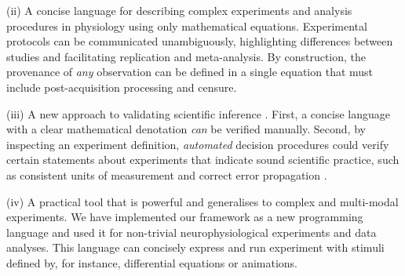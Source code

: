 (ii) A concise language for describing complex experiments and
analysis procedures in physiology using only mathematical
equations. Experimental protocols can be communicated unambiguously,
highlighting differences between studies and facilitating replication
and meta-analysis.  By construction, the provenance
\cite{Pool2002,MacKenzie-Graham2008, VanHorn2009} of \emph{any}
observation can be defined in a single equation that must include
post-acquisition processing and censure.

(iii) A new approach to validating scientific inference
\cite{Editors2003, Editors2010}. First, a concise language with a
clear mathematical denotation \emph{can} be verified manually. Second, by
inspecting an experiment definition, \emph{automated} decision procedures
could verify certain statements about experiments that indicate sound
scientific practice, such as consistent units of measurement
\cite{Kennedy1997} and correct error propagation \cite{Taylor1997}.

(iv) A practical tool that is powerful and generalises to complex and
multi-modal experiments. We have implemented our framework as a new
programming language and used it for non-trivial neurophysiological
experiments and data analyses. This language can concisely express and
run experiment with stimuli defined by, for instance, differential
equations or animations.
